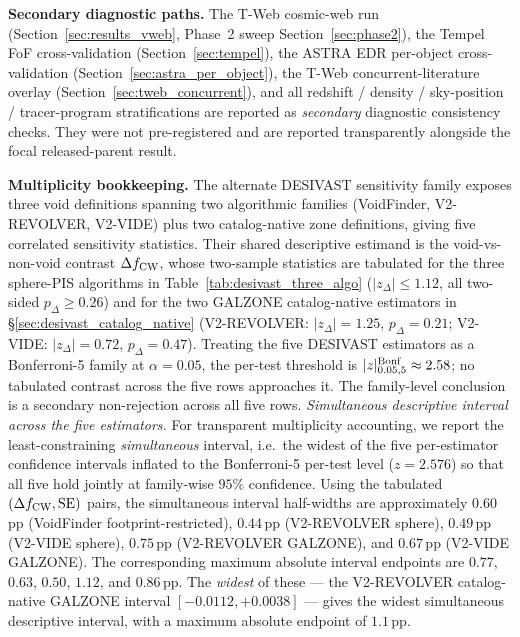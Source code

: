 \documentclass[aps,prd,twocolumn,superscriptaddress,showpacs,preprintnumbers,nofootinbib,longbibliography,floatfix]{revtex4-2}
\begin{document}
\textbf{Secondary diagnostic paths.} The T-Web cosmic-web run
(Section~\ref{sec:results_vweb}, Phase~2 sweep
Section~\ref{sec:phase2}), the Tempel FoF cross-validation
(Section~\ref{sec:tempel}), the ASTRA EDR per-object
cross-validation (Section~\ref{sec:astra_per_object}), the
T-Web concurrent-literature overlay
(Section~\ref{sec:tweb_concurrent}), and all redshift / density /
sky-position / tracer-program stratifications are reported as
\emph{secondary} diagnostic consistency checks. They were not
pre-registered and are reported transparently alongside the focal
released-parent result.

\textbf{Multiplicity bookkeeping.} The alternate DESIVAST sensitivity family
exposes three void definitions spanning two algorithmic families (VoidFinder,
V2-REVOLVER, V2-VIDE) plus two catalog-native zone definitions, giving
five correlated sensitivity statistics. Their shared descriptive estimand
is the void-vs-non-void contrast $\Delta f_{\rm CW}$, whose two-sample
statistics are tabulated for the three sphere-PIS algorithms in
Table~\ref{tab:desivast_three_algo} ($|z_\Delta| \leq 1.12$, all
two-sided $p_\Delta \geq 0.26$) and for the two GALZONE catalog-native
estimators in \S\ref{sec:desivast_catalog_native}
(V2-REVOLVER: $|z_\Delta| = 1.25$, $p_\Delta = 0.21$;
V2-VIDE: $|z_\Delta| = 0.72$, $p_\Delta = 0.47$). Treating the five
DESIVAST estimators as a Bonferroni-5 family at $\alpha = 0.05$, the
per-test threshold is $|z|^{\rm Bonf}_{0.05,5} \approx 2.58$; no
tabulated contrast across the five rows approaches it. The
family-level conclusion is a secondary non-rejection across all five rows.
\emph{Simultaneous descriptive interval across the five estimators.}
For transparent multiplicity accounting, we report the least-constraining
\emph{simultaneous} interval, i.e.\ the widest of the five per-estimator
confidence intervals inflated to the Bonferroni-5 per-test level
($z = 2.576$) so that all five hold jointly at family-wise $95\%$
confidence. Using the tabulated $(\Delta f_{\rm CW}, {\rm SE})$ pairs,
the simultaneous interval half-widths are approximately $0.60$\,pp
(VoidFinder footprint-restricted), $0.44$\,pp (V2-REVOLVER sphere),
$0.49$\,pp (V2-VIDE sphere), $0.75$\,pp (V2-REVOLVER GALZONE), and
$0.67$\,pp (V2-VIDE GALZONE). The corresponding maximum absolute
interval endpoints are $0.77$, $0.63$, $0.50$, $1.12$, and $0.86$\,pp.
The
\emph{widest} of these --- the V2-REVOLVER catalog-native GALZONE
interval $[-0.0112, +0.0038]$ --- gives the widest simultaneous
descriptive interval, with a maximum absolute endpoint of $1.1$\,pp.
\end{document}
